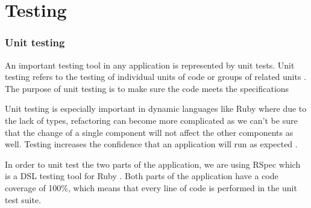 \chapter{Testing}

\subsection{Unit testing}

An important testing tool in any application is represented by unit tests.
Unit testing refers to the testing of individual units of code or groups
of related units \citep{unit_testing}. The purpose of unit testing is to
make sure the code meets the specifications \citep{Olan2003}

Unit testing is especially important
in dynamic languages like Ruby where due to the lack of types, refactoring can
become more complicated as we can't be sure that the change of a single component
will not affect the other components as well. Testing increases the confidence
that an application will run as expected \citep{Olan2003}.

In order to unit
test the two parts of the application, we are using RSpec which is a DSL
testing tool for Ruby \citep{wiki:rspec}. Both parts of the application have a code
coverage of 100\%, which means that every line of code
is performed in the unit test suite.
